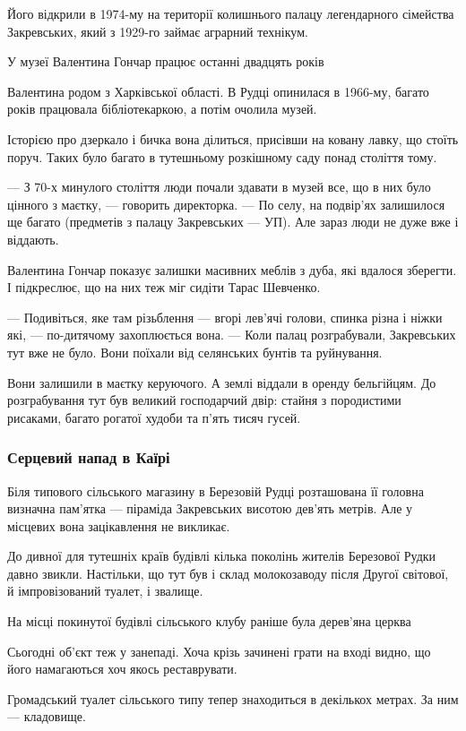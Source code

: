 \documentclass[a4paper,11pt]{extreport}
\begin{document}
Його відкрили в 1974-му на території колишнього палацу легендарного сімейства
Закревських, який з 1929-го займає аграрний технікум.

У музеї Валентина Гончар працює останні двадцять років

Валентина родом з Харківської області. В Рудці опинилася в 1966-му, багато
років працювала бібліотекаркою, а потім очолила музей.

Історією про дзеркало і бичка вона ділиться, присівши на ковану лавку, що
стоїть поруч. Таких було багато в тутешньому розкішному саду понад століття
тому.

--- З 70-х минулого століття люди почали здавати в музей все, що в них було
цінного з маєтку, --- говорить директорка. --- По селу, на подвір’ях залишилося ще
багато (предметів з палацу Закревських --- УП). Але зараз люди не дуже вже і
віддають.

Валентина Гончар показує залишки масивних меблів з дуба, які вдалося зберегти.
І підкреслює, що на них теж міг сидіти Тарас Шевченко.

--- Подивіться, яке там різьблення --- вгорі лев'ячі голови, спинка різна і ніжки
які, --- по-дитячому захоплюється вона. --- Коли палац розграбували, Закревських
тут вже не було. Вони поїхали від селянських бунтів та руйнування.

Вони залишили в маєтку керуючого. А землі віддали в оренду бельгійцям. До
розграбування тут був великий господарчий двір: стайня з породистими рисаками,
багато рогатої худоби та п’ять тисяч гусей.
  
\subsubsection{Серцевий напад в Каїрі}

Біля типового сільського магазину в Березовій Рудці розташована її головна
визначна пам'ятка ---  піраміда Закревських висотою дев'ять метрів. Але у
місцевих вона зацікавлення не викликає.

До дивної для тутешніх країв будівлі кілька поколінь жителів Березової Рудки
давно звикли. Настільки, що тут був і склад молокозаводу після Другої світової,
й імпровізований туалет, і звалище.

На місці покинутої будівлі сільського клубу раніше була дерев'яна церква

Сьогодні об'єкт теж у занепаді. Хоча крізь зачинені грати на вході видно, що
його намагаються хоч якось реставрувати.

Громадський туалет сільського типу тепер знаходиться в декількох метрах. За ним
--- кладовище.
\end{document}
